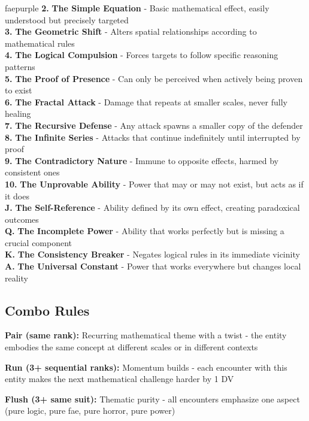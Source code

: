 \documentclass[11pt]{article}
\begin{document}
\begin{campaignsection}{faepurple}
\textbf{2.} \textbf{The Simple Equation} - Basic mathematical effect, easily understood but precisely targeted \\
\textbf{3.} \textbf{The Geometric Shift} - Alters spatial relationships according to mathematical rules \\
\textbf{4.} \textbf{The Logical Compulsion} - Forces targets to follow specific reasoning patterns \\
\textbf{5.} \textbf{The Proof of Presence} - Can only be perceived when actively being proven to exist \\
\textbf{6.} \textbf{The Fractal Attack} - Damage that repeats at smaller scales, never fully healing \\
\textbf{7.} \textbf{The Recursive Defense} - Any attack spawns a smaller copy of the defender \\
\textbf{8.} \textbf{The Infinite Series} - Attacks that continue indefinitely until interrupted by proof \\
\textbf{9.} \textbf{The Contradictory Nature} - Immune to opposite effects, harmed by consistent ones \\
\textbf{10.} \textbf{The Unprovable Ability} - Power that may or may not exist, but acts as if it does \\
\textbf{J.} \textbf{The Self-Reference} - Ability defined by its own effect, creating paradoxical outcomes \\
\textbf{Q.} \textbf{The Incomplete Power} - Ability that works perfectly but is missing a crucial component \\
\textbf{K.} \textbf{The Consistency Breaker} - Negates logical rules in its immediate vicinity \\
\textbf{A.} \textbf{The Universal Constant} - Power that works everywhere but changes local reality

\subsection*{Combo Rules}

\textbf{Pair (same rank):} Recurring mathematical theme with a twist - the entity embodies the same concept at different scales or in different contexts

\textbf{Run (3+ sequential ranks):} Momentum builds - each encounter with this entity makes the next mathematical challenge harder by 1 DV

\textbf{Flush (3+ same suit):} Thematic purity - all encounters emphasize one aspect (pure logic, pure fae, pure horror, pure power)


\end{campaignsection}
\end{document}
